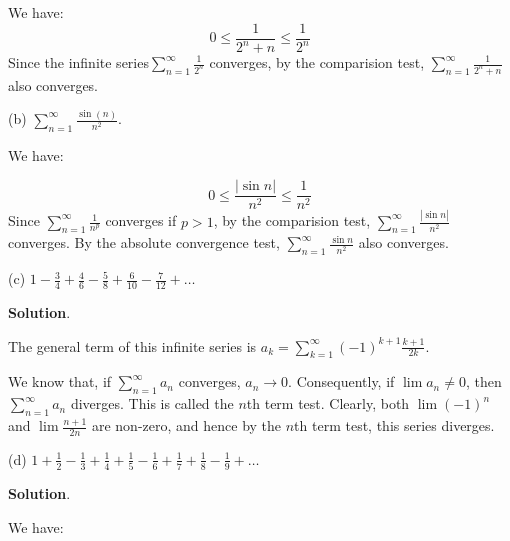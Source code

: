 \documentclass[10pt]{article}
\begin{document}
We have: 
\begin{equation*}
0\leq \frac{1}{2^{n} +n} \leq \frac{1}{2^{n}}
\end{equation*}
Since the infinite series$\displaystyle \sum _{n=1}^{\infty }\frac{1}{2^{n}}$ converges, by the comparision test, $\displaystyle \sum _{n=1}^{\infty }\frac{1}{2^{n} +n}$ also converges.



(b) $\displaystyle \sum _{n=1}^{\infty }\frac{\sin( n)}{n^{2}}$.



We have:


\begin{equation*}
0\leq \frac{|\sin n|}{n^{2}} \leq \frac{1}{n^{2}}
\end{equation*}
Since $\displaystyle \sum _{n=1}^{\infty }\frac{1}{n^{p}}$ converges if $\displaystyle p >1$, by the comparision test, $\displaystyle \sum _{n=1}^{\infty }\frac{|\sin n|}{n^{2}}$ converges. By the absolute convergence test, $\displaystyle \sum _{n=1}^{\infty }\frac{\sin n}{n^{2}}$ also converges.



(c) $\displaystyle 1-\frac{3}{4} +\frac{4}{6} -\frac{5}{8} +\frac{6}{10} -\frac{7}{12} +\dotsc $



\textbf{Solution}.



The general term of this infinite series is $\displaystyle a_{k} =\sum _{k=1}^{\infty }( -1)^{k+1}\frac{k+1}{2k}$.



We know that, if $\displaystyle \sum _{n=1}^{\infty } a_{n}$ converges, $\displaystyle a_{n}\rightarrow 0$. Consequently, if $\displaystyle \lim a_{n} \neq 0$, then $\displaystyle \sum _{n=1}^{\infty } a_{n}$ diverges. This is called the $\displaystyle n$th term test. Clearly, both $\displaystyle \lim ( -1)^{n}$ and $\displaystyle \lim \frac{n+1}{2n}$ are non-zero, and hence by the $\displaystyle n$th term test, this series diverges.



(d) $\displaystyle 1+\frac{1}{2} -\frac{1}{3} +\frac{1}{4} +\frac{1}{5} -\frac{1}{6} +\frac{1}{7} +\frac{1}{8} -\frac{1}{9} +\dotsc $



\textbf{Solution}.



We have:
\end{document}
